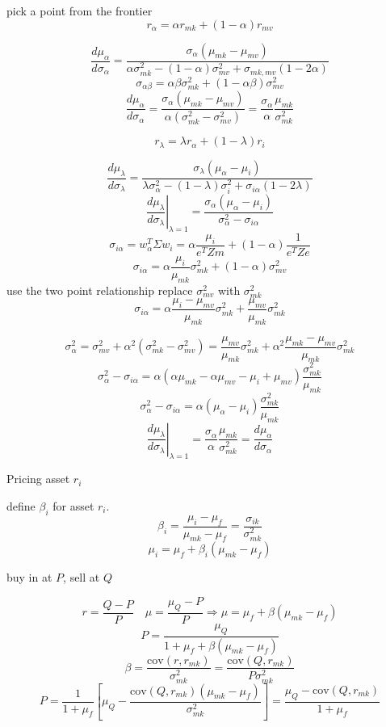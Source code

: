 \documentclass[10pt,a4paper]{article}
\begin{document}
pick a point from the frontier
\[
r_\alpha = \alpha r_{mk} + (1-\alpha) r_{mv}
\]

\[
\frac{d\mu_\alpha}{d\sigma_\alpha} = \frac{\sigma_\alpha(\mu_{mk}-\mu_{mv})}{\alpha\sigma^2_{mk} -(1-\alpha)\sigma_{mv}^2 + \sigma_{mk,mv}(1-2\alpha)}
\]
\[
\sigma_{\alpha\beta} =\alpha\beta \sigma^2_{mk} + (1-\alpha\beta)\sigma^2_{mv}
\]
\[
\frac{d\mu_\alpha}{d\sigma_\alpha} = \frac{\sigma_\alpha(\mu_{mk}-\mu_{mv})}{\alpha(\sigma^2_{mk} -\sigma_{mv}^2)}=\frac{\sigma_\alpha}{\alpha}\frac{\mu_{mk}}{\sigma^2_{mk}}
\]

\[
r_\lambda = \lambda r_\alpha + (1-\lambda) r_i
\]

\[
\frac{d\mu_\lambda}{d\sigma_\lambda} = \frac{\sigma_\lambda(\mu_{\alpha}-\mu_{i})}{\lambda\sigma^2_{\alpha} -(1-\lambda)\sigma_{i}^2 + \sigma_{i\alpha}(1-2\lambda)}
\]
\[
\left.\frac{d\mu_\lambda}{d\sigma_\lambda}\right|_{\lambda = 1} = \frac{\sigma_\alpha(\mu_{\alpha}-\mu_{i})}{\sigma^2_{\alpha} - \sigma_{i\alpha}}
\]
\[
\sigma_{i\alpha} = w_\alpha^T \Sigma w_i = \alpha\frac{\mu_i}{e^TZm}+(1-\alpha)\frac{1}{e^TZe} 
\]
\[
\sigma_{i\alpha} = \alpha \frac{\mu_i}{\mu_{mk}}\sigma^2_{mk} + (1-\alpha)\sigma^2_{mv}
\]
use the two point relationship replace $\sigma^2_{mv}$ with $\sigma^2_{mk}$
\[
\sigma_{i\alpha} = \alpha\frac{\mu_i - \mu_{mv}}{\mu_{mk}}\sigma^2_{mk} +  \frac{\mu_{mv}}{\mu_{mk}}\sigma^2_{mk}
\]

\[ \sigma^2_{\alpha} = \sigma^2_{mv} + \alpha^2 (\sigma^2_{mk} -\sigma^2_{mv}) =  \frac{\mu_{mv}}{\mu_{mk}}\sigma^2_{mk} + \alpha^2 \frac{\mu_{mk} - \mu_{mv}}{\mu_{mk}}\sigma^2_{mk}
\]
\[
\sigma^2_\alpha - \sigma_{i\alpha} = \alpha\left(\alpha \mu_{mk} - \alpha \mu_{mv} -  \mu_i + \mu_{mv}\right)\frac{\sigma^2_{mk}}{\mu_{mk}}
\]
\[
\sigma^2_\alpha - \sigma_{i\alpha} = \alpha\left(\mu_\alpha -  \mu_i \right)\frac{\sigma^2_{mk}}{\mu_{mk}}
\]
\[
\left.\frac{d\mu_\lambda}{d\sigma_\lambda}\right|_{\lambda = 1} = \frac{\sigma_\alpha}{\alpha}\frac{\mu_{mk}}{\sigma^2_{mk}} = \frac{d\mu_\alpha}{d\sigma_\alpha}
\]

\newpage
Pricing asset $r_i$

define $\beta_i$ for asset $r_i$.
\[
\beta_i = \frac{\mu_i - \mu_f}{\mu_{mk} - \mu_f} = \frac{\sigma_{ik}}{\sigma_{mk}^2}
\]
\[
\mu_i = \mu_f + \beta_i (\mu_{mk} - \mu_f)
\]

buy in at $P$, sell at $Q$

\[
r = \frac{Q-P}{P} \quad \mu = \frac{\mu_Q - P}{P}\Rightarrow \mu = \mu_f + \beta (\mu_{mk} - \mu_f)
\]
\[
P = \frac{\mu_Q}{1+\mu_f + \beta(\mu_{mk} - \mu_f)}
\]
\[
\beta = \frac{\mathrm{cov}(r,r_{mk})}{\sigma^2_{mk}} = \frac{\mathrm{cov}(Q,r_{mk})}{P\sigma^2_{mk}}
\]
\[
P = \frac{1}{1+\mu_f}\left[\mu_Q - \frac{\mathrm{cov}(Q,r_{mk})(\mu_{mk} - \mu_f)}{\sigma^2_{mk}}\right] = \frac{\mu_Q - \mathrm{cov}(Q,r_{mk})}{1+\mu_f}
\]
\end{document}
